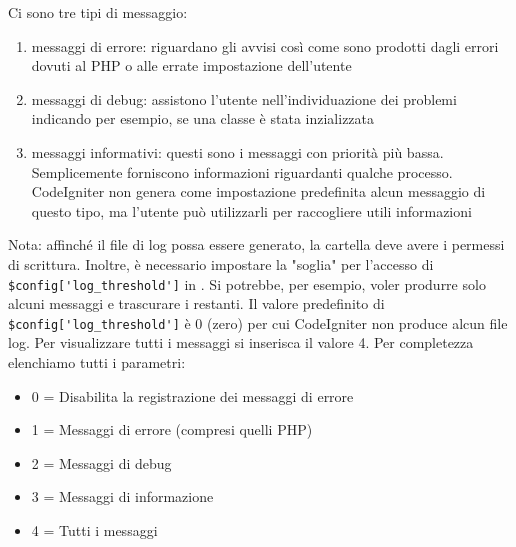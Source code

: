 \begin{itemize}
Ci sono tre tipi di messaggio:
\begin{enumerate}
\item messaggi di errore: riguardano gli avvisi così come sono prodotti dagli errori dovuti al \ac{PHP} o alle errate impostazione dell'utente
\item messaggi di debug: assistono l'utente nell'individuazione dei problemi indicando per esempio, se una classe è stata inzializzata
\item messaggi informativi: questi sono i messaggi con priorità più bassa. Semplicemente forniscono informazioni riguardanti qualche processo. CodeIgniter non genera come impostazione predefinita alcun messaggio di questo tipo, ma l'utente può utilizzarli per raccogliere utili informazioni
\end{enumerate}

Nota: affinché il file di log possa essere generato, la cartella  deve avere i permessi di scrittura. Inoltre, è necessario impostare la "soglia" per l'accesso di \verb|$config['log_threshold']| in . Si potrebbe, per esempio, voler produrre solo alcuni messaggi e trascurare i restanti. Il valore predefinito di \verb|$config['log_threshold']| è 0 (zero) per cui CodeIgniter non produce alcun file log. Per visualizzare tutti i messaggi si inserisca il valore 4. Per completezza elenchiamo tutti i parametri:

\begin{itemize}
\item 0 = Disabilita la registrazione dei messaggi di errore
\item 1 = Messaggi di errore (compresi quelli PHP)
\item 2 = Messaggi di debug
\item 3 = Messaggi di informazione
\item 4 = Tutti i messaggi
\end{itemize}
\end{itemize}